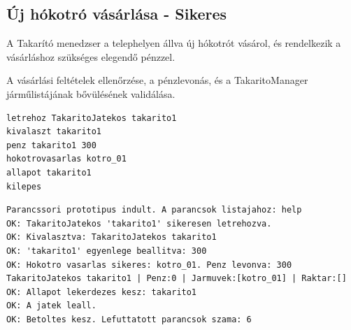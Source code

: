 \subsection{Új hókotró vásárlása - Sikeres}
\begin{test-case-description}
    A Takarító menedzser a telephelyen állva új hókotrót vásárol, és rendelkezik a vásárláshoz szükséges elegendő pénzzel.
\end{test-case-description}
\begin{test-case-function}
    A vásárlási feltételek ellenőrzése, a pénzlevonás, és a TakaritoManager járműlistájának bővülésének validálása.
\end{test-case-function}
\begin{test-case-input}
\begin{verbatim}
letrehoz TakaritoJatekos takarito1
kivalaszt takarito1
penz takarito1 300
hokotrovasarlas kotro_01
allapot takarito1
kilepes
\end{verbatim}
\end{test-case-input}
\begin{test-case-output}
\begin{verbatim}
Parancssori prototipus indult. A parancsok listajahoz: help
OK: TakaritoJatekos 'takarito1' sikeresen letrehozva.
OK: Kivalasztva: TakaritoJatekos takarito1
OK: 'takarito1' egyenlege beallitva: 300
OK: Hokotro vasarlas sikeres: kotro_01. Penz levonva: 300
TakaritoJatekos takarito1 | Penz:0 | Jarmuvek:[kotro_01] | Raktar:[]
OK: Allapot lekerdezes kesz: takarito1
OK: A jatek leall.
OK: Betoltes kesz. Lefuttatott parancsok szama: 6
\end{verbatim}
\end{test-case-output}

